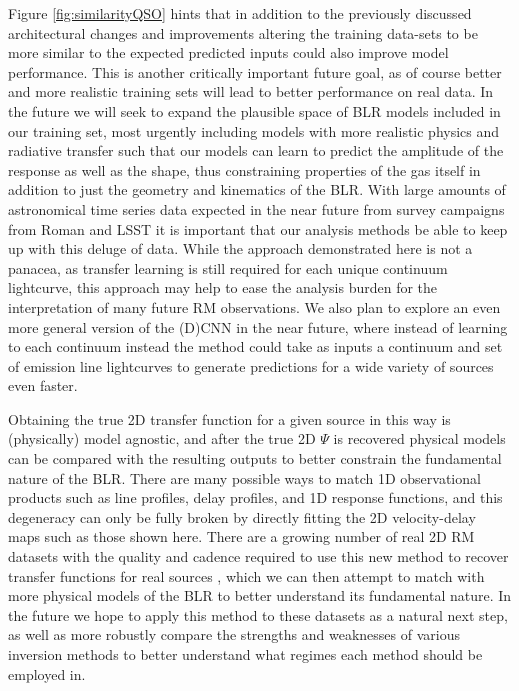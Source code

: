 \documentclass[floatfix,twocolumn,trackchanges,linenumbers]{aastex7}
\begin{document}
Figure \ref{fig:similarityQSO} hints that in addition to the previously discussed architectural changes and improvements altering the training data-sets to be more similar to the expected predicted inputs could also improve model performance. 
This is another critically important future goal, as of course better and more realistic training sets will lead to better performance on real data. In the future we will seek to expand the plausible space of BLR models included in our training set, most urgently including models with
more realistic physics and radiative transfer such that our models can learn to predict the amplitude of the response as well as the shape, thus constraining properties of the gas itself in addition to just the geometry and kinematics of the BLR.
With large amounts of astronomical time series data expected in the near future from survey campaigns from Roman \citep{ROMAN_overview} and LSST \citep{LSST_manual} it is important that our analysis methods be able to keep up with this deluge of data. While the approach demonstrated here is not a panacea, as transfer learning is still required for each unique continuum lightcurve, this approach may help to ease the analysis burden for the interpretation of many future RM observations. We also plan to explore an even more general version of the (D)CNN in the near future, where instead of learning to each continuum instead the method could take as inputs a continuum and set of emission line lightcurves to generate predictions for a wide variety of sources even faster.

Obtaining the true 2D transfer function for a given source in this way is (physically) model agnostic, and after the true 2D $\Psi$ is recovered physical models can be compared with the resulting outputs to better constrain the fundamental nature of the BLR. There are many possible ways to match 1D observational products such as line profiles, delay profiles, and 1D response functions, and this degeneracy can only be fully broken by directly fitting the 2D velocity-delay maps such as those shown here. There are a growing number of real 2D RM datasets with the quality and cadence required to use this new method to recover transfer functions for real sources \citep{STORM_MODEL_SPECTRA,STORM2_II,RM3c27319,Wang_2025_SouthKoreaRM}, which we can then attempt to match with more physical models of the BLR to better understand its fundamental nature. 
In the future we hope to apply this method to these datasets as a natural next step, as well as more robustly compare the strengths and weaknesses of various inversion methods to better understand what regimes each method should be employed in.
\end{document}
